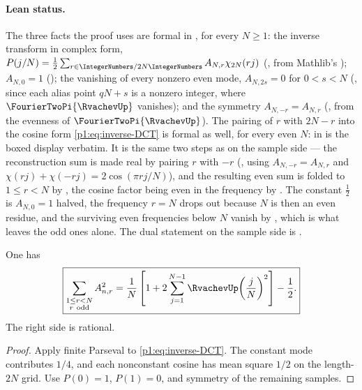 \documentclass[11pt,oneside]{article}
\theoremstyle{definition}
\theoremstyle{remark}
\begin{document}
\paragraph{Lean status.}
The three facts the proof uses are formal in , for every
\(N\ge1\): the inverse transform in complex form,
\(P(j/N)=\tfrac12\sum_{r\in\IntegerNumbers/2N\IntegerNumbers}A_{N,r}\chi_{2N}(rj)\)
(, from Mathlib's );
\(A_{N,0}=1\) (); the vanishing of every nonzero even
mode, \(A_{N,2s}=0\) for \(0<s<N\) (, since
each alias point \(qN+s\) is a nonzero integer, where \(\FourierTwoPi{\RvachevUp}\) vanishes);
and the symmetry \(A_{N,-r}=A_{N,r}\) (, from the
evenness of \(\FourierTwoPi{\RvachevUp}\)).  The pairing of \(r\) with \(2N-r\) into the cosine
form \eqref{p1:eq:inverse-DCT} is formal as well, for every even \(N\):
 in  is the boxed
display verbatim.  It is the same two steps as on the sample side --- the reconstruction sum is
made real by pairing \(r\) with \(-r\) (,
using \(A_{N,-r}=A_{N,r}\) and \(\chi(rj)+\chi(-rj)=2\cos(\pi rj/N)\)), and the resulting even
sum is folded to \(1\le r<N\) by , the cosine factor being
even in the frequency by .  The constant \(\tfrac12\) is
\(A_{N,0}=1\) halved, the frequency \(r=N\) drops out because \(N\) is then an even residue, and
the surviving even frequencies below \(N\) vanish by
, which is what leaves the odd ones alone.  The
dual statement on the sample side is .

\begin{corollary}\label{p1:cor:discrete-energy}
One has
\begin{equation}\label{p1:eq:discrete-energy}
 \boxed{
 \sum_{\substack{1\le r<N\\r\ \mathrm{odd}}}A_{n,r}^2
 =\frac1N\left[1+2\sum_{j=1}^{N-1}
 \RvachevUp\!\left(\frac jN\right)^2\right]-\frac12.}
\end{equation}
The right side is rational.
\end{corollary}

\begin{proof}
Apply finite Parseval to \eqref{p1:eq:inverse-DCT}.  The constant mode contributes
$1/4$, and each nonconstant cosine has mean square $1/2$ on the length-$2N$
grid.  Use $P(0)=1$, $P(1)=0$, and symmetry of the remaining samples.
\end{proof}
\end{document}
